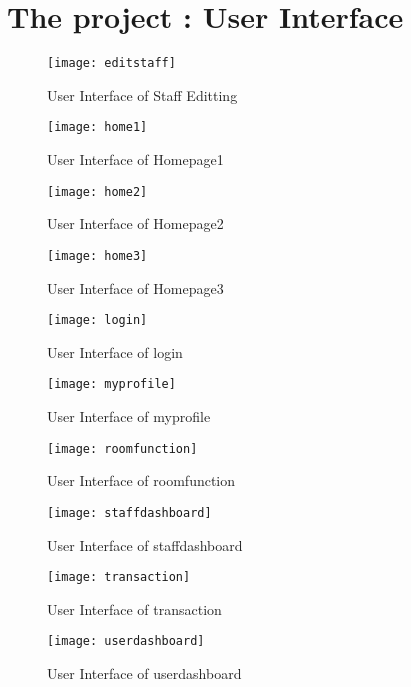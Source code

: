         \section{The project : User Interface}

    \begin{center}
      \begin{figure}
        \texttt{[image: editstaff]}
        \caption{User Interface of Staff Editting}
      \end{figure}
      \begin{figure}
        \texttt{[image: home1]}
        \caption{User Interface of Homepage1}
      \end{figure}
      \begin{figure}
        \texttt{[image: home2]}
        \caption{User Interface of Homepage2}
      \end{figure}
      \begin{figure}
        \texttt{[image: home3]}
        \caption{User Interface of Homepage3}
      \end{figure}
      \begin{figure}
        \texttt{[image: login]}
        \caption{User Interface of login}
      \end{figure}
      \begin{figure}
        \texttt{[image: myprofile]}
        \caption{User Interface of myprofile}
      \end{figure}
      \begin{figure}
        \texttt{[image: roomfunction]}
        \caption{User Interface of roomfunction}
      \end{figure}
      \begin{figure}
        \texttt{[image: staffdashboard]}
        \caption{User Interface of staffdashboard}
      \end{figure}
      \begin{figure}
        \texttt{[image: transaction]}
        \caption{User Interface of transaction}
      \end{figure}
      \begin{figure}
        \texttt{[image: userdashboard]}
        \caption{User Interface of userdashboard}
      \end{figure}

      \end{center}











